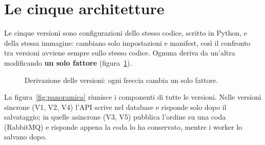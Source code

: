 \section{Le cinque architetture}
\label{s:architetture}

Le cinque versioni sono configurazioni dello stesso codice, scritto in Python, e della stessa immagine: cambiano solo impostazioni e manifest, così il confronto tra versioni avviene sempre sullo stesso codice. Ognuna deriva da un'altra modificando \textbf{un solo fattore} (figura~\ref{fig:derivazione}).

\begin{figure}[H]
\centering
{}
\caption{Derivazione delle versioni: ogni freccia cambia un solo fattore.}
\label{fig:derivazione}
\end{figure}

La figura~\ref{fig:panoramica} riunisce i componenti di tutte le versioni. Nelle versioni sincrone (V1, V2, V4) l'API scrive nel database e risponde solo dopo il salvataggio; in quelle asincrone (V3, V5) pubblica l'ordine su una coda (RabbitMQ) e risponde appena la coda lo ha conservato, mentre i worker lo salvano dopo.

